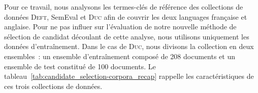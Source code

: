       Pour ce travail, nous analysons les termes-clés de référence des
      collections de données \textsc{Deft}, SemEval et \textsc{Duc} afin de
      couvrir les deux languages française et anglaise. Pour ne pas influer sur
      l'évaluation de notre nouvelle méthode de sélection de candidat découlant
      de cette analyse, nous utilisons uniquement les données d'entraînement.
      Dans le cas de \textsc{Duc}, nous divisons la collection en deux
      ensembles~: un ensemble d'entraînement composé de 208 documents et un
      ensemble de test constitué de 100 documents. Le
      tableau~\ref{tab:candidate_selection-corpora_recap} rappelle les
      caractéristiques de ces trois collections de données.
      \begin{table}[!h]
        \centering

        \caption{Rappel des corpus utilisés pour analyser les termes-clés de
                 référence 
                 \label{tab:candidate_selection-corpora_recap}}
      \end{table}

